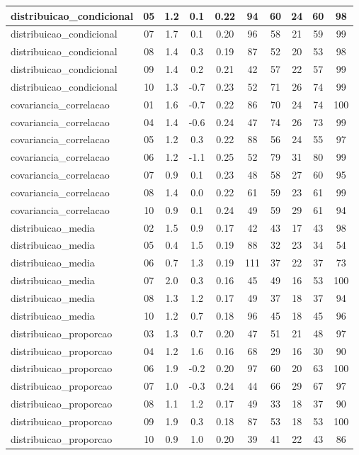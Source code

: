 \documentclass[a4paper]{report}
\begin{document}
\begin{longtable}{l|c|c|c|c|c|c|c|c|c}
distribuicao\_condicional & 05 & 1.2 & 0.1 & 0.22 & 94 & 60 & 24 & 60 & 98\\
\hline
distribuicao\_condicional & 07 & 1.7 & 0.1 & 0.20 & 96 & 58 & 21 & 59 & 99\\
\hline
distribuicao\_condicional & 08 & 1.4 & 0.3 & 0.19 & 87 & 52 & 20 & 53 & 98\\
\hline
distribuicao\_condicional & 09 & 1.4 & 0.2 & 0.21 & 42 & 57 & 22 & 57 & 99\\
\hline
distribuicao\_condicional & 10 & 1.3 & -0.7 & 0.23 & 52 & 71 & 26 & 74 & 99\\
\hline
covariancia\_correlacao & 01 & 1.6 & -0.7 & 0.22 & 86 & 70 & 24 & 74 & 100\\
\hline
covariancia\_correlacao & 04 & 1.4 & -0.6 & 0.24 & 47 & 74 & 26 & 73 & 99\\
\hline
covariancia\_correlacao & 05 & 1.2 & 0.3 & 0.22 & 88 & 56 & 24 & 55 & 97\\
\hline
covariancia\_correlacao & 06 & 1.2 & -1.1 & 0.25 & 52 & 79 & 31 & 80 & 99\\
\hline
covariancia\_correlacao & 07 & 0.9 & 0.1 & 0.23 & 48 & 58 & 27 & 60 & 95\\
\hline
covariancia\_correlacao & 08 & 1.4 & 0.0 & 0.22 & 61 & 59 & 23 & 61 & 99\\
\hline
covariancia\_correlacao & 10 & 0.9 & 0.1 & 0.24 & 49 & 59 & 29 & 61 & 94\\
\hline
distribuicao\_media & 02 & 1.5 & 0.9 & 0.17 & 42 & 43 & 17 & 43 & 98\\
\hline
distribuicao\_media & 05 & 0.4 & 1.5 & 0.19 & 88 & 32 & 23 & 34 & 54\\
\hline
distribuicao\_media & 06 & 0.7 & 1.3 & 0.19 & 111 & 37 & 22 & 37 & 73\\
\hline
distribuicao\_media & 07 & 2.0 & 0.3 & 0.16 & 45 & 49 & 16 & 53 & 100\\
\hline
distribuicao\_media & 08 & 1.3 & 1.2 & 0.17 & 49 & 37 & 18 & 37 & 94\\
\hline
distribuicao\_media & 10 & 1.2 & 0.7 & 0.18 & 96 & 45 & 18 & 45 & 96\\
\hline
distribuicao\_proporcao & 03 & 1.3 & 0.7 & 0.20 & 47 & 51 & 21 & 48 & 97\\
\hline
distribuicao\_proporcao & 04 & 1.2 & 1.6 & 0.16 & 68 & 29 & 16 & 30 & 90\\
\hline
distribuicao\_proporcao & 06 & 1.9 & -0.2 & 0.20 & 97 & 60 & 20 & 63 & 100\\
\hline
distribuicao\_proporcao & 07 & 1.0 & -0.3 & 0.24 & 44 & 66 & 29 & 67 & 97\\
\hline
distribuicao\_proporcao & 08 & 1.1 & 1.2 & 0.17 & 49 & 33 & 18 & 37 & 90\\
\hline
distribuicao\_proporcao & 09 & 1.9 & 0.3 & 0.18 & 87 & 53 & 18 & 53 & 100\\
\hline
distribuicao\_proporcao & 10 & 0.9 & 1.0 & 0.20 & 39 & 41 & 22 & 43 & 86\\
\hline
\end{longtable}
\end{document}
